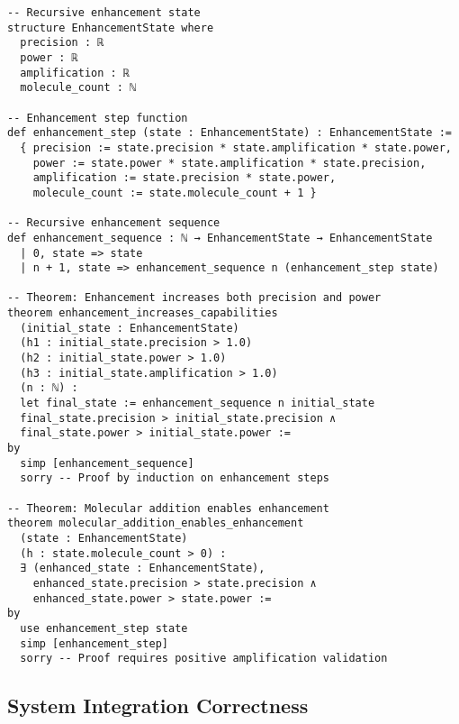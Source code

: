 \begin{lstlisting}[language=lean, caption=Recursive Molecular Enhancement]
-- Recursive enhancement state
structure EnhancementState where
  precision : ℝ
  power : ℝ
  amplification : ℝ
  molecule_count : ℕ

-- Enhancement step function
def enhancement_step (state : EnhancementState) : EnhancementState :=
  { precision := state.precision * state.amplification * state.power,
    power := state.power * state.amplification * state.precision,
    amplification := state.precision * state.power,
    molecule_count := state.molecule_count + 1 }

-- Recursive enhancement sequence
def enhancement_sequence : ℕ → EnhancementState → EnhancementState
  | 0, state => state
  | n + 1, state => enhancement_sequence n (enhancement_step state)

-- Theorem: Enhancement increases both precision and power
theorem enhancement_increases_capabilities 
  (initial_state : EnhancementState)
  (h1 : initial_state.precision > 1.0)
  (h2 : initial_state.power > 1.0)
  (h3 : initial_state.amplification > 1.0)
  (n : ℕ) :
  let final_state := enhancement_sequence n initial_state
  final_state.precision > initial_state.precision ∧ 
  final_state.power > initial_state.power :=
by
  simp [enhancement_sequence]
  sorry -- Proof by induction on enhancement steps

-- Theorem: Molecular addition enables enhancement
theorem molecular_addition_enables_enhancement 
  (state : EnhancementState)
  (h : state.molecule_count > 0) :
  ∃ (enhanced_state : EnhancementState),
    enhanced_state.precision > state.precision ∧
    enhanced_state.power > state.power :=
by
  use enhancement_step state
  simp [enhancement_step]
  sorry -- Proof requires positive amplification validation
\end{lstlisting}

\subsection{System Integration Correctness}

